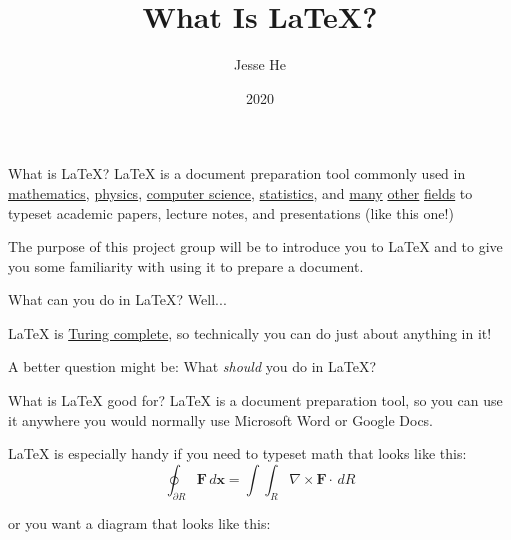 \documentclass{beamer}
\title{What Is \LaTeX?}
\author{Jesse He}
\institute{OSU MMC Project Group}
\date{2020}
\begin{document}
\frame{\titlepage}

\begin{frame}{What is \LaTeX?}
    \pause \LaTeX{} is a document preparation tool commonly used in
    \href{https://arxiv.org/pdf/2001.00683.pdf}{mathematics},
    \href{https://arxiv.org/pdf/2001.00863.pdf}{physics},
    \href{https://arxiv.org/pdf/1912.13122.pdf}{computer science},
    \href{https://arxiv.org/pdf/2001.00921.pdf}{statistics},
    and \href{https://arxiv.org/pdf/1912.13167.pdf}{many}
    \href{https://arxiv.org/pdf/1912.12611.pdf}{other}
    \href{https://arxiv.org/pdf/2001.00889.pdf}{fields}
    to typeset academic papers, lecture notes, and presentations (like this one!)
    
    \pause
    The purpose of this project group will be to introduce you to \LaTeX{} and
    to give you some familiarity with using it to prepare a document.
\end{frame}

\begin{frame}{What can you do in \LaTeX?}
    \pause
    Well...
    
    \pause
    \LaTeX{} is \href{https://en.wikipedia.org/wiki/Turing_completeness}{Turing complete},
    so technically you can do just about anything in it!

    \pause
    A better question might be:
    \pause
    What \textit{should} you do in \LaTeX?
\end{frame}

\begin{frame}{What is \LaTeX{} good for?}
    \pause
    \LaTeX{} is a document preparation tool, so you can use it anywhere you would normally use
    Microsoft Word or Google Docs.
    
    \pause
    \LaTeX{} is especially handy if you need to typeset math that looks like this:
    \[
        \oint_{\partial R} \mathbf{F} \,d\mathbf{x} = \int \int_R \nabla \times \mathbf{F} \cdot \,dR
    \]
    
    \pause
    or you want a diagram that looks like this:
    \begin{center}
    \end{center}
\end{frame}
\end{document}
